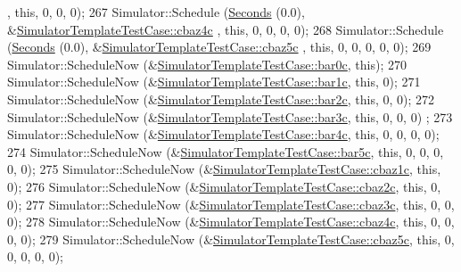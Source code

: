 \begin{DoxyCode}
      , \textcolor{keyword}{this}, 0, 0, 0);
267   Simulator::Schedule (\hyperlink{group__timecivil_ga33c34b816f8ff6628e33d5c8e9713b9e}{Seconds} (0.0), &\hyperlink{classSimulatorTemplateTestCase_a7ce3f71d66de538a7cd7c33faa0c4c17}{SimulatorTemplateTestCase::cbaz4c}
      , \textcolor{keyword}{this}, 0, 0, 0, 0);
268   Simulator::Schedule (\hyperlink{group__timecivil_ga33c34b816f8ff6628e33d5c8e9713b9e}{Seconds} (0.0), &\hyperlink{classSimulatorTemplateTestCase_a2472cd2565c2643449dfe42756a0e58f}{SimulatorTemplateTestCase::cbaz5c}
      , \textcolor{keyword}{this}, 0, 0, 0, 0, 0);
269   Simulator::ScheduleNow (&\hyperlink{classSimulatorTemplateTestCase_a39381dd6c298ce90120f9ca020b51a44}{SimulatorTemplateTestCase::bar0c}, \textcolor{keyword}{this});
270   Simulator::ScheduleNow (&\hyperlink{classSimulatorTemplateTestCase_a17a705290d33ff9d9752c5fcd3ca549a}{SimulatorTemplateTestCase::bar1c}, \textcolor{keyword}{this}, 0);
271   Simulator::ScheduleNow (&\hyperlink{classSimulatorTemplateTestCase_a95e0f184170b9dd6ced11d3423752e9f}{SimulatorTemplateTestCase::bar2c}, \textcolor{keyword}{this}, 0, 0);
272   Simulator::ScheduleNow (&\hyperlink{classSimulatorTemplateTestCase_a3440409096aee7c6dda41caab7cceeb6}{SimulatorTemplateTestCase::bar3c}, \textcolor{keyword}{this}, 0, 0, 0)
      ;
273   Simulator::ScheduleNow (&\hyperlink{classSimulatorTemplateTestCase_a4d7fde0e0f8f16201cb8731a65c84188}{SimulatorTemplateTestCase::bar4c}, \textcolor{keyword}{this}, 0, 0, 0,
       0);
274   Simulator::ScheduleNow (&\hyperlink{classSimulatorTemplateTestCase_af3908d1e88e554a76b7fcb7c6011182a}{SimulatorTemplateTestCase::bar5c}, \textcolor{keyword}{this}, 0, 0, 0,
       0, 0);
275   Simulator::ScheduleNow (&\hyperlink{classSimulatorTemplateTestCase_abfb9fdb2a45df1b572e31d911da70af1}{SimulatorTemplateTestCase::cbaz1c}, \textcolor{keyword}{this}, 0);
276   Simulator::ScheduleNow (&\hyperlink{classSimulatorTemplateTestCase_aceaaaedcf5defc916793b2b5d0908cae}{SimulatorTemplateTestCase::cbaz2c}, \textcolor{keyword}{this}, 0, 0);
277   Simulator::ScheduleNow (&\hyperlink{classSimulatorTemplateTestCase_a231add1c9938940ecfde69823e44dfc4}{SimulatorTemplateTestCase::cbaz3c}, \textcolor{keyword}{this}, 0, 0, 
      0);
278   Simulator::ScheduleNow (&\hyperlink{classSimulatorTemplateTestCase_a7ce3f71d66de538a7cd7c33faa0c4c17}{SimulatorTemplateTestCase::cbaz4c}, \textcolor{keyword}{this}, 0, 0, 
      0, 0);
279   Simulator::ScheduleNow (&\hyperlink{classSimulatorTemplateTestCase_a2472cd2565c2643449dfe42756a0e58f}{SimulatorTemplateTestCase::cbaz5c}, \textcolor{keyword}{this}, 0, 0, 
      0, 0, 0);

\end{DoxyCode}
